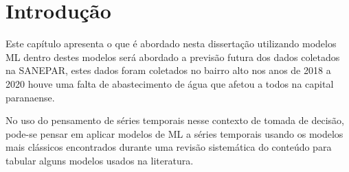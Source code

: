 

\section{Introdu{\c c}{\~a}o} \label{sec:int}

Este capítulo apresenta o que é abordado nesta dissertação utilizando modelos ML dentro destes modelos será abordado a previsão futura dos dados coletados na SANEPAR, estes dados foram coletados no bairro alto nos anos de 2018 a 2020 houve uma falta de abastecimento de água que afetou a todos na capital paranaense.

No uso do pensamento de séries temporais nesse contexto de tomada de decisão, pode-se pensar em aplicar modelos de ML a séries temporais usando os modelos mais clássicos encontrados durante uma revisão sistemática do conteúdo para tabular alguns modelos usados na literatura.  




          

   

    

    

    